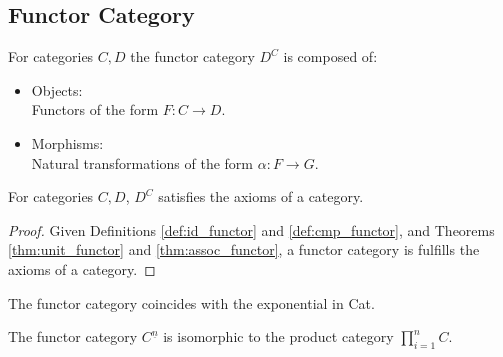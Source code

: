 \subsection{Functor Category}
\begin{definition}
  For categories $C, D$ the functor category $D^C$ is composed of:
  \parencite{leinster:basic_category_theory}
  \begin{itemize}
    \item Objects:\\
      Functors of the form $F:C\to D$.
    \item Morphisms:\\
      Natural transformations of the form $\alpha:F\to G$.
  \end{itemize}
\end{definition}

\begin{theorem}
  For categories $C, D$, $D^C$ satisfies the axioms of a category.

  \begin{proof}
    Given Definitions \ref{def:id_functor} and \ref{def:cmp_functor}, and
    Theorems \ref{thm:unit_functor} and \ref{thm:assoc_functor}, a functor
    category is fulfills the axioms of a category.
  \end{proof}
\end{theorem}

\begin{remark}
  The functor category coincides with the exponential in Cat.
\end{remark}

\begin{remark}
  The functor category $C^{\underline{n}}$ is isomorphic to the product category
  $\prod_{i=1}^n C$.
\end{remark}